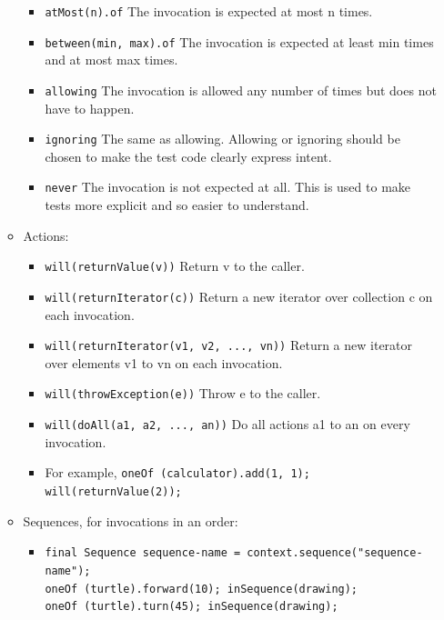 \documentclass{article}
\begin{document}
\begin{enumerate}
\begin{itemize}
\begin{itemize}
                \item \lstinline{atMost(n).of}	The invocation is expected at most n times.
                \item \lstinline{between(min, max).of}	The invocation is expected at least min times and at most max times.
                \item \lstinline{allowing}	The invocation is allowed any number of times but does not have to happen.
                \item \lstinline{ignoring}	The same as allowing. Allowing or ignoring should be chosen to make the test code clearly express intent.
                \item \lstinline{never}	The invocation is not expected at all. This is used to make tests more explicit and so easier to understand.
            \end{itemize}
            \item Actions:
            \begin{itemize}
                \item \lstinline{will(returnValue(v))}	Return v to the caller.
                \item \lstinline{will(returnIterator(c))}	Return a new iterator over collection c on each invocation.
                \item \lstinline{will(returnIterator(v1, v2, ..., vn))}	Return a new iterator over elements v1 to vn on each invocation.
                \item \lstinline{will(throwException(e))}	Throw e to the caller.
                \item \lstinline{will(doAll(a1, a2, ..., an))}	Do all actions a1 to an on every invocation.
                \item For example, \lstinline{oneOf (calculator).add(1, 1); will(returnValue(2));}
            \end{itemize}
            \item Sequences, for invocations in an order:
            \begin{itemize}
                \item \lstinline{final Sequence sequence-name = context.sequence("sequence-name");}\\
                      \lstinline{oneOf (turtle).forward(10); inSequence(drawing);}\\
                      \lstinline{oneOf (turtle).turn(45); inSequence(drawing);}
            \end{itemize}
        \end{itemize}
\end{enumerate}
\end{document}
